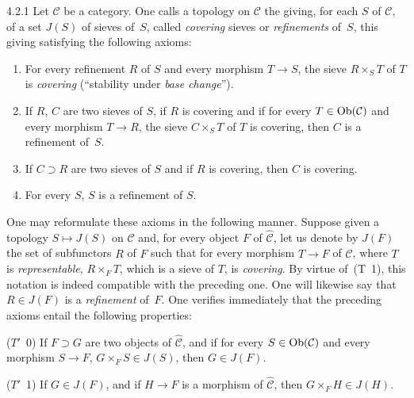 \begin{definition}{4.2.1}
\label{IV.4.2.1}
Let \(\mathcal{C}\) be a category. One calls a topology on \(\mathcal{C}\)
the giving, for each \(S\) of \(\mathcal{C}\), of a set \(J(S)\) of sieves
of~\(S\), called \emph{covering} sieves or \emph{refinements} of~\(S\),
this giving satisfying the following axioms:
\begin{enumerate}[label=\textup{(T~\arabic*)},leftmargin=2.8em,itemsep=0.45em,topsep=0.45em]
\item For every refinement \(R\) of \(S\) and every morphism \(T\to S\), the
sieve \(R\times_{S}T\) of \(T\) is \emph{covering} (``stability under
\emph{base change}'').
\item If \(R\), \(C\) are two sieves of \(S\), if \(R\) is covering and if
for every \(T\in\operatorname{Ob}(\mathcal{C})\) and every morphism \(T\to R\), the sieve
\(C\times_{S}T\) of \(T\) is covering, then \(C\) is a refinement
of~\(S\).%
{\renewcommand{\thefootnote}{(20)}}
\item If \(C\supset R\) are two sieves of \(S\) and if \(R\) is covering,
then \(C\) is covering.
\item For every \(S\), \(S\) is a refinement of \(S\).
\end{enumerate}
\end{definition}

One may reformulate these axioms in the following manner. Suppose given a
topology \(S\mapsto J(S)\) on \(\mathcal{C}\) and, for every object \(F\) of
\(\widehat{\mathcal{C}}\), let us denote by \(J(F)\) the set of
subfunctors \(R\) of \(F\) such that for every morphism \(T\to F\) of
\(\widehat{\mathcal{C}}\), where \(T\) is \emph{representable},
\(R\times_{F}T\), which is a sieve of \(T\), is \emph{covering}. By virtue
of~(T~1), this notation is indeed compatible with the preceding one. One
will likewise say that \(R\in J(F)\) is a \emph{refinement} of~\(F\). One
verifies immediately that the preceding axioms entail the following
properties:

\par\smallskip\noindent
(\(T'\)~0) If \(F\supset G\) are two objects of \(\widehat{\mathcal{C}}\),
and if for every \(S\in\operatorname{Ob}(\mathcal{C})\) and every morphism \(S\to F\),
\(G\times_{F}S\in J(S)\), then \(G\in J(F)\).

\par\smallskip\noindent
(\(T'\)~1) If \(G\in J(F)\), and if \(H\to F\) is a morphism of
\(\widehat{\mathcal{C}}\), then \(G\times_{F}H\in J(H)\).

